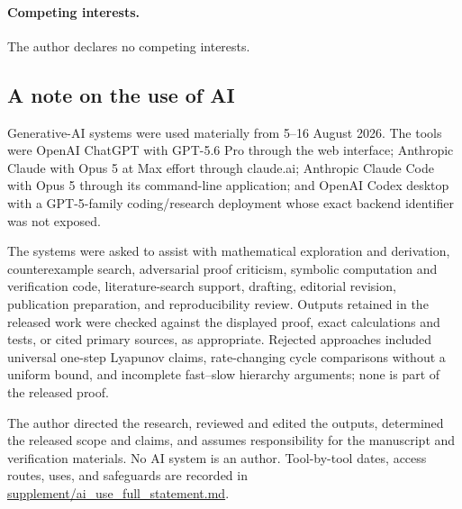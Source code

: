\paragraph{Competing interests.}
The author declares no competing interests.

\subsection*{A note on the use of AI}
Generative-AI systems were used materially from 5--16 August 2026.  The tools
were OpenAI ChatGPT with GPT-5.6 Pro through the web interface; Anthropic
Claude with Opus 5 at Max effort through claude.ai; Anthropic Claude Code with
Opus 5 through its command-line application; and OpenAI Codex desktop with a
GPT-5-family coding/research deployment whose exact backend identifier was not
exposed.

The systems were asked to assist with mathematical exploration and derivation,
counterexample search, adversarial proof criticism, symbolic computation and
verification code, literature-search support, drafting, editorial revision,
publication preparation, and reproducibility review.  Outputs retained in the
released work were checked against the displayed proof, exact calculations and
tests, or cited primary sources, as appropriate.  Rejected approaches included universal
one-step Lyapunov claims, rate-changing cycle comparisons without a uniform
bound, and incomplete fast--slow hierarchy arguments; none is part of the
released proof.

The author directed the research, reviewed and edited the outputs, determined
the released scope and claims, and assumes responsibility for the manuscript
and verification materials.  No AI system is an author.  Tool-by-tool dates,
access routes, uses, and safeguards are recorded in
\href{https://github.com/AlecKriebel/Math/blob/bimolecular-positive-recurrence-v1.2.2/bimolecular_positive_recurrence_submission_v1_2_2/supplement/ai_use_full_statement.md}{supplement/ai\_use\_full\_statement.md}.



